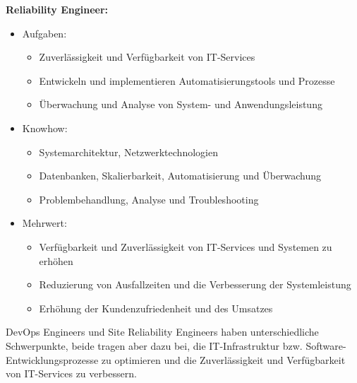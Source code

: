 \newpage
\textbf{Reliability Engineer:}
\begin{itemize}
    \item Aufgaben:
          \begin{itemize}
              \item Zuverlässigkeit und Verfügbarkeit von IT-Services
              \item Entwickeln und implementieren Automatisierungstools und Prozesse
              \item Überwachung und Analyse von System- und Anwendungsleistung
          \end{itemize}
    \item Knowhow:
          \begin{itemize}
              \item Systemarchitektur, Netzwerktechnologien
              \item Datenbanken, Skalierbarkeit, Automatisierung und Überwachung
              \item Problembehandlung, Analyse und Troubleshooting
          \end{itemize}
    \item Mehrwert:
          \begin{itemize}
              \item Verfügbarkeit und Zuverlässigkeit von IT-Services und Systemen zu erhöhen
              \item  Reduzierung von Ausfallzeiten und die Verbesserung der Systemleistung
              \item Erhöhung der Kundenzufriedenheit und des Umsatzes
          \end{itemize}
\end{itemize}

DevOps Engineers und Site Reliability Engineers haben unterschiedliche Schwerpunkte, beide tragen aber dazu bei, die IT-Infrastruktur bzw. Software-Entwicklungsprozesse zu optimieren und die Zuverlässigkeit und Verfügbarkeit von IT-Services zu verbessern.